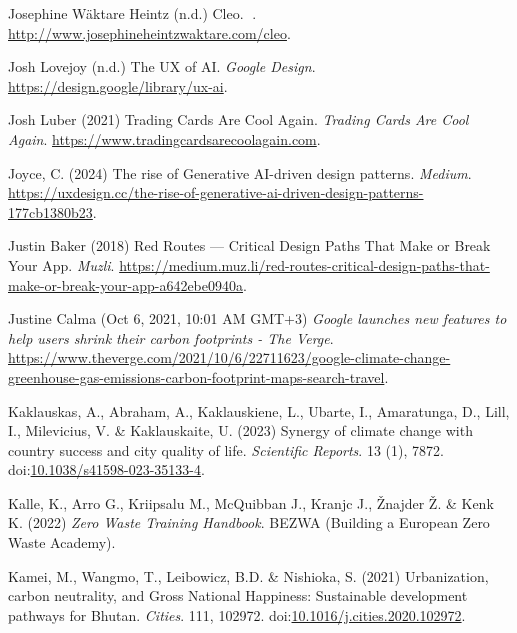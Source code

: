 \documentclass[
  letterpaper,
  DIV=11,
  numbers=noendperiod]{scrartcl}
\newlength{\cslhangindent}
\newenvironment{CSLReferences}[2] %
 {\begin{list}{}{%
  \setlength{\itemindent}{0pt}
  \setlength{\leftmargin}{0pt}
  \setlength{\parsep}{0pt}
  \ifodd #1
   \setlength{\leftmargin}{\cslhangindent}
   \setlength{\itemindent}{-1\cslhangindent}
  \fi
  \setlength{\itemsep}{#2\baselineskip}}}
 {\end{list}}
\begin{document}
\begin{CSLReferences}{0}{1}
Josephine Wäktare Heintz (n.d.) Cleo. \emph{👀}.
\url{http://www.josephineheintzwaktare.com/cleo}.

Josh Lovejoy (n.d.) The {UX} of {AI}. \emph{Google Design}.
\url{https://design.google/library/ux-ai}.

Josh Luber (2021) Trading {Cards Are Cool Again}. \emph{Trading Cards
Are Cool Again}. \url{https://www.tradingcardsarecoolagain.com}.

Joyce, C. (2024) The rise of {Generative AI-driven} design patterns.
\emph{Medium}.
\url{https://uxdesign.cc/the-rise-of-generative-ai-driven-design-patterns-177cb1380b23}.

Justin Baker (2018) Red {Routes} --- {Critical Design Paths That Make}
or {Break Your App}. \emph{Muzli}.
\url{https://medium.muz.li/red-routes-critical-design-paths-that-make-or-break-your-app-a642ebe0940a}.

Justine Calma (Oct 6, 2021, 10:01 AM GMT+3) \emph{Google launches new
features to help users shrink their carbon footprints - {The Verge}}.
\url{https://www.theverge.com/2021/10/6/22711623/google-climate-change-greenhouse-gas-emissions-carbon-footprint-maps-search-travel}.

Kaklauskas, A., Abraham, A., Kaklauskiene, L., Ubarte, I., Amaratunga,
D., Lill, I., Milevicius, V. \& Kaklauskaite, U. (2023) Synergy of
climate change with country success and city quality of life.
\emph{Scientific Reports}. 13 (1), 7872.
doi:\href{https://doi.org/10.1038/s41598-023-35133-4}{10.1038/s41598-023-35133-4}.

Kalle, K., Arro G., Kriipsalu M., McQuibban J., Kranjc J., Žnajder Ž. \&
Kenk K. (2022) \emph{Zero {Waste Training Handbook}}. BEZWA (Building a
European Zero Waste Academy).

Kamei, M., Wangmo, T., Leibowicz, B.D. \& Nishioka, S. (2021)
Urbanization, carbon neutrality, and {Gross National Happiness}:
{Sustainable} development pathways for {Bhutan}. \emph{Cities}. 111,
102972.
doi:\href{https://doi.org/10.1016/j.cities.2020.102972}{10.1016/j.cities.2020.102972}.


\end{CSLReferences}
\end{document}
